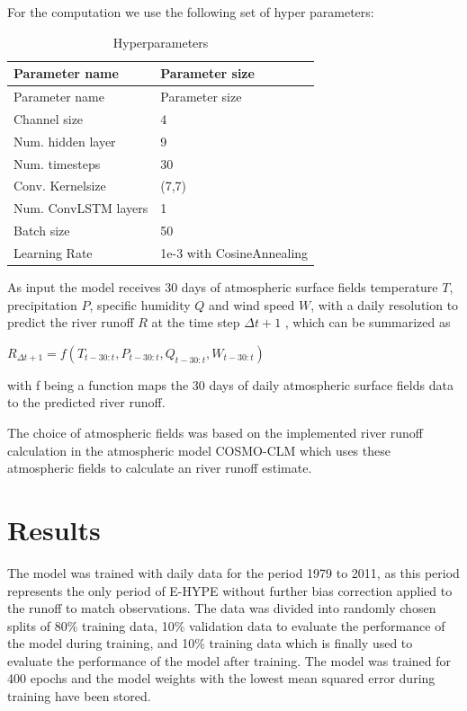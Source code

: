 \documentclass[
]{agujournal2019}
\begin{document}
For the computation we use the following set of hyper parameters:

\hypertarget{tbl-letters}{}
\begin{longtable}[]{@{}ll@{}}
\caption{\label{tbl-letters}Hyperparameters}\tabularnewline
\toprule()
Parameter name & Parameter size \\
\midrule()
\endfirsthead
\toprule()
Parameter name & Parameter size \\
\midrule()
\endhead
Channel size & 4 \\
Num. hidden layer & 9 \\
Num. timesteps & 30 \\
Conv. Kernelsize & (7,7) \\
Num. ConvLSTM layers & 1 \\
Batch size & 50 \\
Learning Rate & 1e-3 with CosineAnnealing \\
\bottomrule()
\end{longtable}

As input the model receives 30 days of atmospheric surface fields
temperature \(T\), precipitation \(P\), specific humidity \(Q\) and wind
speed \(W\), with a daily resolution to predict the river runoff \(R\)
at the time step \(\Delta t+1\) , which can be summarized as

\(R_{\Delta t+1} = f\left(T_{t-30:t}, P_{t-30:t}, Q_{t-30:t}, W_{t-30:t}\right)\)

with f being a function maps the 30 days of daily atmospheric surface
fields data to the predicted river runoff.

The choice of atmospheric fields was based on the implemented river
runoff calculation in the atmospheric model COSMO-CLM which uses these
atmospheric fields to calculate an river runoff estimate.

\hypertarget{results}{%
\section{Results}\label{results}}

The model was trained with daily data for the period 1979 to 2011, as
this period represents the only period of E-HYPE without further bias
correction applied to the runoff to match observations. The data was
divided into randomly chosen splits of 80\(\%\) training data, 10\(\%\)
validation data to evaluate the performance of the model during
training, and 10\(\%\) training data which is finally used to evaluate
the performance of the model after training. The model was trained for
400 epochs and the model weights with the lowest mean squared error
during training have been stored.
\end{document}
